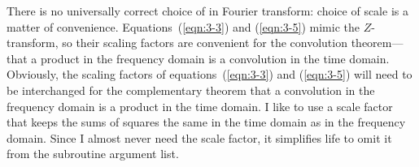 \par
There is no universally correct choice
of  in Fourier transform:
choice of scale is a matter of convenience.
Equations~(\ref{eqn:3-3}) and (\ref{eqn:3-5}) mimic the $Z$-transform,
so their scaling factors are
convenient for the convolution theorem---that
a product in the frequency domain is a convolution in the time domain.
Obviously, the scaling factors of
equations~(\ref{eqn:3-3}) and (\ref{eqn:3-5})
will need to be interchanged for the
complementary theorem 
that a convolution in the frequency domain
is a product in the time domain.
I like to use a scale factor that keeps the sums of squares
the same in the time domain as in the frequency domain.
Since I almost never need the scale factor,
it simplifies life to omit it from the subroutine argument list.
\begin{comment}
When a scaling program is desired,
we can use a simple one like \texttt{scale()} \vpageref{/prog:scale}.
Complex-valued data can be scaled with {\tt scale()}
merely by doubling the value of {\tt n}.

\progdex{scale}{scale an array}

\subsection{The simple FT code}
Subroutine \texttt{simpleft()} \vpageref{/prog:simpleft} exhibits features
found in many physics and engineering programs.
For example, the time-domain signal (which is denoted ``{\tt tt()}"),
has {\tt nt} values subscripted, from {\tt tt(1)} to {\tt tt(nt)}.
The first value of this signal {\tt tt(1)} is located
in real physical time at {\tt t0}.
The time interval between values is {\tt dt}.
The value of {\tt tt(it)} is at time {\tt t0+(it-1)*dt}.
We do not use ``{\tt if}'' as a pointer on the frequency axis
because {\tt if} is a keyword in most programming languages.
Instead, we count along the frequency axis with a variable named {\tt ie}.%
\progdex{simpleft}{slow FT}
The total frequency band is
$2\pi$ radians per sample unit
or $1/\Delta t$ Hz.
Dividing the total interval by the number of points {\tt nf} gives $\Delta f$.
We could choose the frequencies to run from 0 to $2\pi$ radians/sample.
That would work well for many applications,
but it would be a nuisance for applications such as differentiation
in the frequency domain, which require multiplication by $-i\omega$
including the \bxbx{negative frequencies}{negative frequency}
as well as the positive.
So it seems more natural to begin at the most negative frequency
and step forward to the most positive frequency.
\end{comment}

